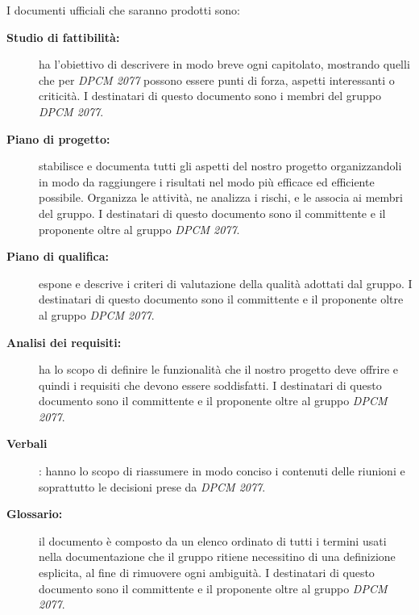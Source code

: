 					I documenti ufficiali che saranno prodotti sono:
					\begin{description}
						\item[\textbf{Studio di fattibilità:}] ha l'obiettivo di descrivere in modo breve ogni capitolato, mostrando quelli che per \textit{DPCM 2077} possono essere punti di forza, aspetti interessanti o criticità. I destinatari di questo documento sono i membri del gruppo \textit{DPCM 2077}.
						\item[\textbf{Piano di progetto:}] stabilisce e documenta tutti gli aspetti del nostro progetto organizzandoli in modo da raggiungere i risultati nel modo più efficace ed efficiente possibile. Organizza le attività, ne analizza i rischi, e le associa ai membri del gruppo. I destinatari di questo documento sono il committente e il proponente oltre al gruppo \textit{DPCM 2077}. 
						\item[\textbf{Piano di qualifica:}] espone e descrive i criteri di valutazione della qualità adottati dal gruppo. I destinatari di questo documento sono il committente e il proponente oltre al gruppo \textit{DPCM 2077}. 
						\item[\textbf{Analisi dei requisiti:}] ha lo scopo di definire le funzionalità che il nostro progetto deve offrire e quindi i requisiti che devono essere soddisfatti. I destinatari di questo documento sono il committente e il proponente oltre al gruppo \textit{DPCM 2077}.
						\item[\textbf{Verbali}]: hanno lo scopo di riassumere in modo conciso i contenuti delle riunioni e soprattutto le decisioni prese da \textit{DPCM 2077}.
						\item[\textbf{Glossario:}] il documento è composto da un elenco ordinato di tutti i termini usati nella documentazione che il gruppo ritiene necessitino di una definizione esplicita, al fine di rimuovere ogni ambiguità. I destinatari di questo documento sono il committente e il proponente oltre al gruppo \textit{DPCM 2077}.
					\end{description}
					
